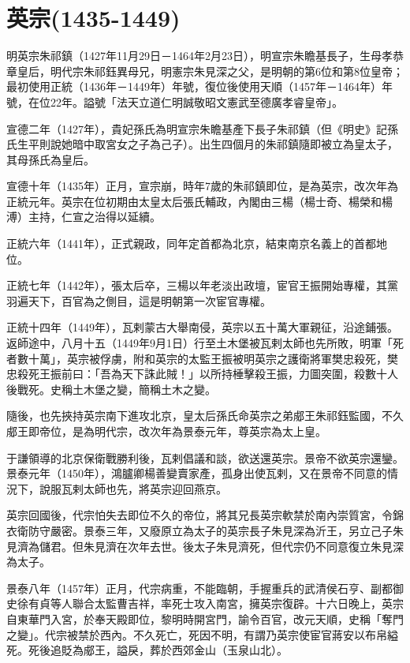 
\section{英宗\tiny(1435-1449)}

明英宗朱祁鎮（1427年11月29日－1464年2月23日），明宣宗朱瞻基長子，生母孝恭章皇后，明代宗朱祁鈺異母兄，明憲宗朱見深之父，是明朝的第6位和第8位皇帝；最初使用正統（1436年－1449年）年號，復位後使用天順（1457年－1464年）年號，在位22年。謚號「法天立道仁明誠敬昭文憲武至德廣孝睿皇帝」。

宣德二年（1427年），貴妃孫氏為明宣宗朱瞻基產下長子朱祁鎮（但《明史》記孫氏生平則說她暗中取宮女之子為己子）。出生四個月的朱祁鎮隨即被立為皇太子，其母孫氏為皇后。

宣德十年（1435年）正月，宣宗崩，時年7歲的朱祁鎮即位，是為英宗，改次年為正統元年。英宗在位初期由太皇太后張氏輔政，內閣由三楊（楊士奇、楊榮和楊溥）主持，仁宣之治得以延續。

正統六年（1441年），正式親政，同年定首都為北京，結束南京名義上的首都地位。

正統七年（1442年），張太后卒，三楊以年老淡出政壇，宦官王振開始專權，其黨羽遍天下，百官為之側目，這是明朝第一次宦官專權。

正統十四年（1449年），瓦剌蒙古大舉南侵，英宗以五十萬大軍親征，沿途鋪張。返師途中，八月十五（1449年9月1日）行至土木堡被瓦剌太師也先所敗，明軍「死者數十萬」，英宗被俘虜，附和英宗的太監王振被明英宗之護衛將軍樊忠殺死，樊忠殺死王振前曰：「吾為天下誅此賊！」以所持棰擊殺王振，力圖突圍，殺數十人後戰死。史稱土木堡之變，簡稱土木之變。

隨後，也先挾持英宗南下進攻北京，皇太后孫氏命英宗之弟郕王朱祁鈺監國，不久郕王即帝位，是為明代宗，改次年為景泰元年，尊英宗為太上皇。

于謙領導的北京保衛戰勝利後，瓦剌倡議和談，欲送還英宗。景帝不欲英宗還鑾。景泰元年（1450年），鴻臚卿楊善變賣家產，孤身出使瓦剌，又在景帝不同意的情況下，說服瓦剌太師也先，將英宗迎回燕京。

英宗回國後，代宗怕失去即位不久的帝位，將其兄長英宗軟禁於南內崇質宮，令錦衣衛防守嚴密。景泰三年，又廢原立為太子的英宗長子朱見深為沂王，另立己子朱見濟為儲君。但朱見濟在次年去世。後太子朱見濟死，但代宗仍不同意復立朱見深為太子。

景泰八年（1457年）正月，代宗病重，不能臨朝，手握重兵的武清侯石亨、副都御史徐有貞等人聯合太監曹吉祥，率死士攻入南宮，擁英宗復辟。十六日晚上，英宗自東華門入宮，於奉天殿即位，黎明時開宮門，諭令百官，改元天順，史稱「奪門之變」。代宗被禁於西內。不久死亡，死因不明，有謂乃英宗使宦官蔣安以布帛縊死。死後追貶為郕王，謚戾，葬於西郊金山（玉泉山北）。

